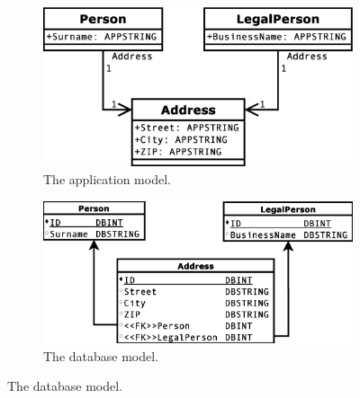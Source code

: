\documentclass[runningheads]{comsis}
\begin{document}
\begin{figure}
\begin{subfigure}[b]{0.45\textwidth}
	\centering
	\includegraphics[width=\textwidth]{./images/case_app_9}
	\caption{The application model.}
\end{subfigure}
\quad
\begin{subfigure}[b]{0.45\textwidth}
	\centering
	\includegraphics[width=\textwidth]{./images/case_db_8}
	\caption{The database model.}
\end{subfigure}


\end{figure}
\end{document}
